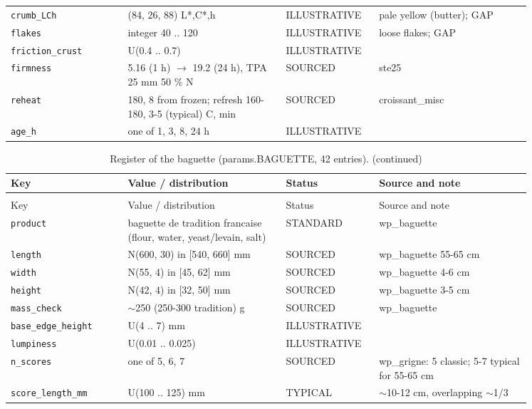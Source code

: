 \documentclass[10.5pt,a4paper]{article}
\begin{document}
{\begin{longtable}{@{}p{0.2\linewidth}p{0.27\linewidth}p{0.12\linewidth}p{0.26\linewidth}@{}}
\texttt{crumb\_\allowbreak{}LCh} & (84, 26, 88) L*,C*,h & ILLUSTRATIVE & pale yellow (butter); GAP \\
\texttt{flakes} & integer 40 .. 120 & ILLUSTRATIVE & loose flakes; GAP \\
\texttt{friction\_\allowbreak{}crust} & U(0.4 .. 0.7) & ILLUSTRATIVE &  \\
\texttt{firmness} & 5.16 (1 h) $\to$ 19.2 (24 h), TPA 25 mm 50 \% N & SOURCED & ste25 \\
\texttt{reheat} & 180, 8 from frozen; refresh 160-180, 3-5 (typical) C, min & SOURCED & croissant\_misc \\
\texttt{age\_\allowbreak{}h} & one of 1, 3, 8, 24 h & ILLUSTRATIVE &  \\\bottomrule\end{longtable}}
{\scriptsize\begin{longtable}{@{}p{0.2\linewidth}p{0.27\linewidth}p{0.12\linewidth}p{0.26\linewidth}@{}}\caption{Register of the baguette (params.BAGUETTE, 42 entries).}\\\toprule Key & Value / distribution & Status & Source and note \\\midrule\endfirsthead
\caption[]{Register of the baguette (params.BAGUETTE, 42 entries). (continued)}\\\toprule Key & Value / distribution & Status & Source and note \\\midrule\endhead
\texttt{product} & baguette de tradition francaise (flour, water, yeast/levain, salt) & STANDARD & wp\_baguette \\
\texttt{length} & N(600, 30) in [540, 660] mm & SOURCED & wp\_baguette 55-65 cm \\
\texttt{width} & N(55, 4) in [45, 62] mm & SOURCED & wp\_baguette 4-6 cm \\
\texttt{height} & N(42, 4) in [32, 50] mm & SOURCED & wp\_baguette 3-5 cm \\
\texttt{mass\_\allowbreak{}check} & $\sim$250 (250-300 tradition) g & SOURCED & wp\_baguette \\
\texttt{base\_\allowbreak{}edge\_\allowbreak{}height} & U(4 .. 7) mm & ILLUSTRATIVE &  \\
\texttt{lumpiness} & U(0.01 .. 0.025) & ILLUSTRATIVE &  \\
\texttt{n\_\allowbreak{}scores} & one of 5, 6, 7 & SOURCED & wp\_grigne: 5 classic; 5-7 typical for 55-65 cm \\
\texttt{score\_\allowbreak{}length\_\allowbreak{}mm} & U(100 .. 125) mm & TYPICAL & $\sim$10-12 cm, overlapping $\sim$1/3 \\

\end{longtable}}
\end{document}

